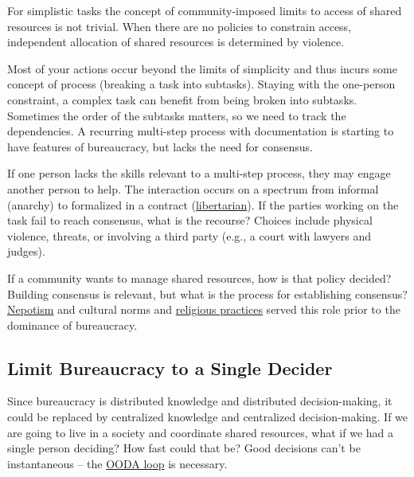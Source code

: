 For simplistic tasks the concept of community-imposed limits to access of \glspl{shared resource}
is not trivial. When there are no policies to constrain access, independent allocation of shared resources is determined by violence.

Most of your actions occur beyond the limits of simplicity and thus incurs some concept of \gls{process}
(breaking a task into subtasks). Staying with the one-person constraint, a complex task can benefit from being broken into subtasks. Sometimes the order of the subtasks matters, so we need to track the dependencies. A recurring multi-step process with documentation is starting to have features of bureaucracy, but lacks the need for consensus. 


If one person lacks the skills relevant to a multi-step process, they may engage another person to help. The interaction occurs on a spectrum from informal (anarchy) to formalized in a contract (\href{https://en.wikipedia.org/wiki/Libertarianism}{libertarian}).
If the parties working on the task fail to reach consensus, what is the recourse? Choices include physical violence, threats, or involving a third party (e.g., a court with lawyers and judges). 


If a community wants to manage shared resources, how is that policy decided?  Building consensus is relevant, but what is the process for establishing consensus? 
\href{https://en.wikipedia.org/wiki/Nepotism}{Nepotism} and
cultural norms and 
\href{https://en.wikipedia.org/wiki/Religion}{religious practices}
served this role prior to the dominance of bureaucracy. 


\subsection*{Limit Bureaucracy to a Single Decider\label{sec:single-decider}}

Since bureaucracy is distributed knowledge and distributed decision-making, it could be replaced by centralized knowledge and centralized decision-making. If we are going to live in a society and coordinate shared resources, what if we had a single person deciding? How fast could that be? Good decisions can't be instantaneous -- the 
\href{https://en.wikipedia.org/wiki/OODA_loop}{OODA loop} 
is necessary. 

